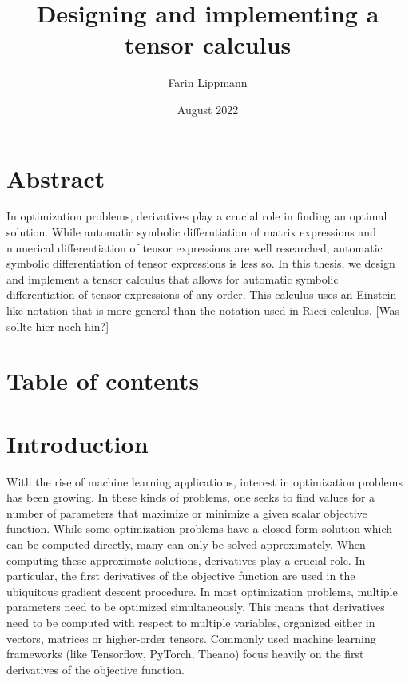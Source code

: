 \documentclass[12pt, a4paper]{report}
\title{Designing and implementing a tensor calculus}
\author{Farin Lippmann}
\date{August 2022}
\begin{document}
\maketitle

\chapter{Abstract}
In optimization problems, derivatives play a crucial role in finding an optimal solution.
While automatic symbolic differntiation of matrix expressions and numerical differentiation of tensor expressions are well researched, automatic symbolic differentiation of tensor expressions is less so.
In this thesis, we design and implement a tensor calculus that allows for automatic symbolic differentiation of tensor expressions of any order.
This calculus uses an Einstein-like notation that is more general than the notation used in Ricci calculus.
[Was sollte hier noch hin?]


\chapter{Table of contents}
\setcounter{page}{3}

\chapter{Introduction}

With the rise of machine learning applications, interest in optimization problems has been growing.
In these kinds of problems, one seeks to find values for a number of parameters that maximize or minimize a given scalar objective function.
While some optimization problems have a closed-form solution which can be computed directly, many can only be solved approximately.
When computing these approximate solutions, derivatives play a crucial role.
In particular, the first derivatives of the objective function are used in the ubiquitous gradient descent procedure.
In most optimization problems, multiple parameters need to be optimized simultaneously.
This means that derivatives need to be computed with respect to multiple variables, organized either in vectors, matrices or higher-order tensors.
Commonly used machine learning frameworks (like Tensorflow, PyTorch, Theano) focus heavily on the first derivatives of the objective function.
\end{document}
